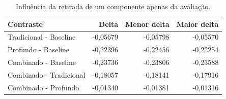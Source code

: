 \begin{table}[htbp]
\centering\small
\caption{Influência da retirada de um componente apenas da avaliação.}
\label{tab:remocao}
\begin{tabular}{lrrr}
\toprule
Contraste & Delta & Menor delta & Maior delta \\
\midrule
Tradicional - Baseline & -0,05679 & -0,05798 & -0,05570 \\
Profundo - Baseline & -0,22396 & -0,22456 & -0,22254 \\
Combinado - Baseline & -0,23736 & -0,23806 & -0,23588 \\
Combinado - Tradicional & -0,18057 & -0,18141 & -0,17916 \\
Combinado - Profundo & -0,01340 & -0,01381 & -0,01316 \\
\bottomrule
\end{tabular}
\end{table}
